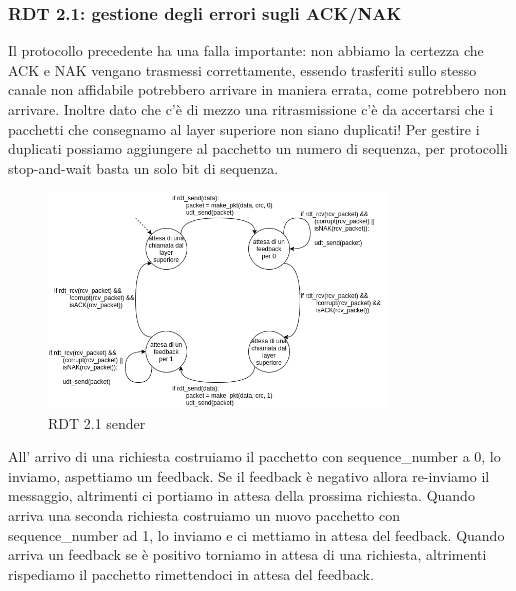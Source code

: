 \subsubsection{RDT 2.1: gestione degli errori sugli ACK/NAK}
Il protocollo precedente ha una falla importante: non abbiamo la certezza che ACK e NAK vengano trasmessi correttamente, essendo trasferiti sullo stesso canale non affidabile potrebbero arrivare in maniera errata, come potrebbero non arrivare.
Inoltre dato che c'è di mezzo una ritrasmissione c'è da accertarsi che i pacchetti che consegnamo al layer superiore non siano duplicati!
Per gestire i duplicati possiamo aggiungere al pacchetto un numero di sequenza, per protocolli stop-and-wait basta un solo bit di sequenza.
\begin{figure}[H]
    \centering
    \includegraphics[width=340px]{images/3_Reti_connessione_diretta/rdt_2.1_sender.png}
    \caption{RDT 2.1 sender}
\end{figure}
All' arrivo di una richiesta costruiamo il pacchetto con sequence\_number a 0, lo inviamo, aspettiamo un feedback.
Se il feedback è negativo allora re-inviamo il messaggio, altrimenti ci portiamo in attesa della prossima richiesta.
Quando arriva una seconda richiesta costruiamo un nuovo pacchetto con sequence\_number ad 1, lo inviamo e ci mettiamo in attesa del feedback.
Quando arriva un feedback se è positivo torniamo in attesa di una richiesta, altrimenti rispediamo il pacchetto rimettendoci in attesa del feedback.

